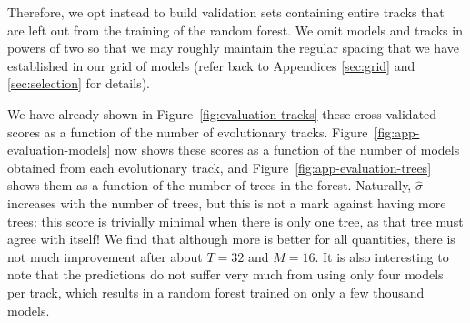 Therefore, we opt instead to build validation sets containing entire tracks that are left out from the training of the random forest. We omit models and tracks in powers of two so that we may roughly maintain the regular spacing that we have established in our grid of models (refer back to Appendices \ref{sec:grid} and \ref{sec:selection} for details). 

We have already shown in Figure~\ref{fig:evaluation-tracks} these cross-validated scores as a function of the number of evolutionary tracks. Figure~\ref{fig:app-evaluation-models} now shows these scores as a function of the number of models obtained from each evolutionary track, and Figure~\ref{fig:app-evaluation-trees} shows them as a function of the number of trees in the forest. Naturally, $\hat\sigma$ increases with the number of trees, but this is not a mark against having more trees: this score is trivially minimal when there is only one tree, as that tree must agree with itself! We find that although more is better for all quantities,  there is not much improvement after about ${T=32}$ and ${M=16}$. It is also interesting to note that the predictions do not suffer very much from using only four models per track, which results in a random forest trained on only a few thousand models. 


